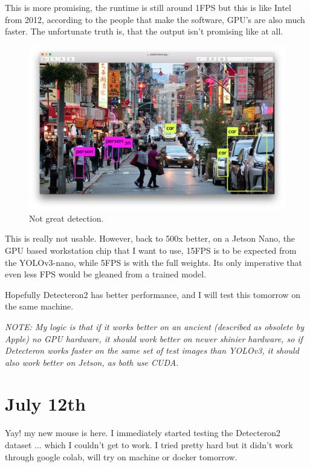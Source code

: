 \documentclass{article}
\begin{document}
This is more promising, the runtime is still around 1FPS but this is like Intel from 2012, according to the people that make the software, GPU's are also much faster. The unfortunate truth is, that the output isn't promising like at all.

\begin{figure}[htbp]
    \centerline{\includegraphics[scale=0.3]{Images/PredS4.png}}
    \caption{Not great detection.}
    \label{fig5}
\end{figure}

This is really not usable. However, back to 500x better, on a Jetson Nano, the GPU based workstation chip that I want to use, 15FPS is to be expected from the YOLOv3-nano, while 5FPS is with the full weights. Its only imperative that even less FPS would be gleaned from a trained model.

Hopefully Detecteron2 has better performance, and I will test this tomorrow on the same machine.

\textit{NOTE: My logic is that if it works better on an ancient (described as obsolete by Apple) no GPU hardware, it should work better on newer shinier hardware, so if Detecteron works faster on the same set of test images than YOLOv3, it should also work better on Jetson, as both use CUDA.}

\section{July 12th}

Yay! my new mouse is here. I immediately started testing the Detecteron2 dataset ... which I couldn't get to work. I tried pretty hard but it didn't work through google colab, will try on machine or docker tomorrow.
\end{document}
